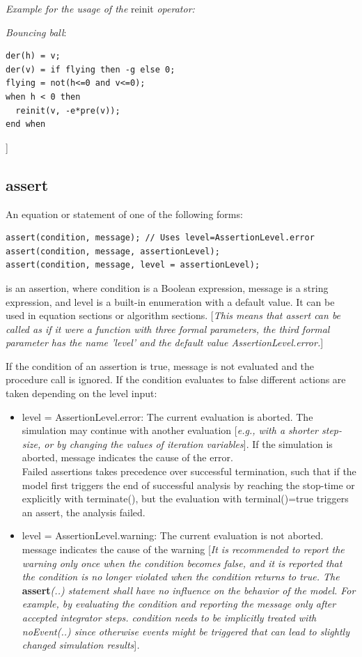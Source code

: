 \documentclass[10pt,a4paper]{report}
\def\doublelabel#1{\label{#1}\hypertarget{#1}{}}
\begin{document}
\emph{Example for the usage of the} reinit \emph{operator:}

\emph{Bouncing ball}:
\begin{lstlisting}[language=modelica]
der(h) = v;  
der(v) = if flying then -g else 0; 
flying = not(h<=0 and v<=0); 
when h < 0 then
  reinit(v, -e*pre(v)); 
end when
\end{lstlisting}

{]}

\subsection{assert}\doublelabel{assert}

An equation or statement of one of the following forms:

\begin{lstlisting}[language=modelica]
assert(condition, message); // Uses level=AssertionLevel.error
assert(condition, message, assertionLevel);
assert(condition, message, level = assertionLevel);
\end{lstlisting}

is an assertion, where condition is a Boolean expression, message is a
string expression, and level is a built-in enumeration with a default
value. It can be used in equation sections or algorithm sections.
{[}\emph{This means that assert can be called as if it were a function
with three formal parameters, the third formal parameter has the name
'level' and the default value AssertionLevel.error.}{]}

If the condition of an assertion is true, message is not evaluated and
the procedure call is ignored. If the condition evaluates to false
different actions are taken depending on the level input:

\begin{itemize}
\item
  level = AssertionLevel.error: The current evaluation is aborted. The
  simulation may continue with another evaluation {[}\emph{e.g., with a
  shorter step-size, or by changing the values of iteration
  variables}{]}. If the simulation is aborted, message indicates the
  cause of the error.\\
  Failed assertions takes precedence over successful termination, such
  that if the model first triggers the end of successful analysis by
  reaching the stop-time or explicitly with terminate(), but the
  evaluation with terminal()=true triggers an assert, the analysis
  failed.
\item
  level = AssertionLevel.warning: The current evaluation is not aborted.
  message indicates the cause of the warning {[}\emph{It is recommended
  to report the warning only once when the condition becomes false, and
  it is reported that the condition is no longer violated when the
  condition returns to true. The} \textbf{assert}\emph{(..) statement
  shall have no influence on the behavior of the model. For example, by
  evaluating the condition and reporting the message only after accepted
  integrator steps. condition needs to be implicitly treated with
  noEvent(..) since otherwise events might be triggered that can lead to
  slightly changed simulation results}{]}\emph{.}
\end{itemize}
\end{document}
